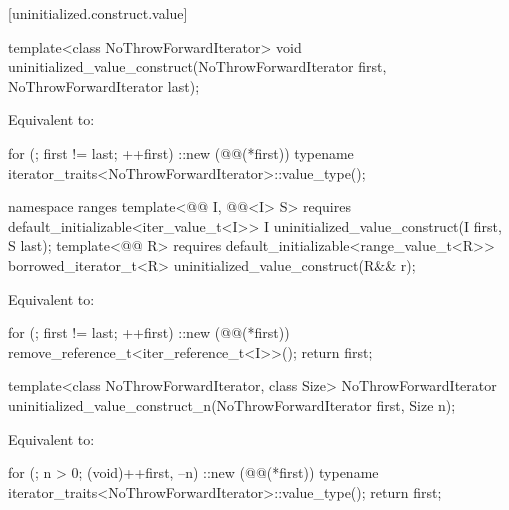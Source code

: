 [uninitialized.construct.value]{}

%
\begin{itemdecl}
template<class NoThrowForwardIterator>
  void uninitialized_value_construct(NoThrowForwardIterator first, NoThrowForwardIterator last);
\end{itemdecl}

\begin{itemdescr}
\pnum
\effects
Equivalent to:
\begin{codeblock}
for (; first != last; ++first)
  ::new (@@(*first))
    typename iterator_traits<NoThrowForwardIterator>::value_type();
\end{codeblock}
\end{itemdescr}

%
\begin{itemdecl}
namespace ranges {
  template<@@ I, @@<I> S>
      requires default_initializable<iter_value_t<I>>
    I uninitialized_value_construct(I first, S last);
  template<@@ R>
      requires default_initializable<range_value_t<R>>
    borrowed_iterator_t<R> uninitialized_value_construct(R&& r);
}
\end{itemdecl}

\begin{itemdescr}
\pnum
\effects
Equivalent to:
\begin{codeblock}
for (; first != last; ++first)
  ::new (@@(*first)) remove_reference_t<iter_reference_t<I>>();
return first;
\end{codeblock}
\end{itemdescr}

%
\begin{itemdecl}
template<class NoThrowForwardIterator, class Size>
  NoThrowForwardIterator uninitialized_value_construct_n(NoThrowForwardIterator first, Size n);
\end{itemdecl}

\begin{itemdescr}
\pnum
\effects
Equivalent to:
\begin{codeblock}
for (; n > 0; (void)++first, --n)
  ::new (@@(*first))
    typename iterator_traits<NoThrowForwardIterator>::value_type();
return first;
\end{codeblock}
\end{itemdescr}

